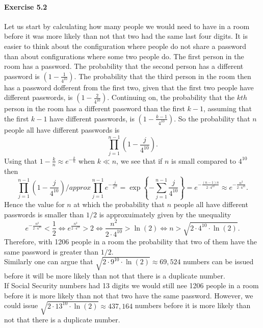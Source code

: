\paragraph{Exercise 5.2} Let us start by calculating how many people we would
need to have in a room before it was more likely than not that two had the
same last four digits. It is easier to think about the configuration where
people do not share a password than about configurations where some two people
do. The first person in the room has a password. The probability that the second
person has a different password is $\left(1- \frac{1}{4^{10}}\right)$. The
probability that the third person in the room then has a password dofferent from
the first two, given that the first two people have different passwords, is
$\left(1- \frac{2}{4^{10}}\right)$. Continuing on, the probability that the
$kth$ person in the room has a different password than the first $k-1$,
assuming that the first $k-1$ have different passwords, is
$\left(1- \frac{k-1}{4^{10}}\right)$. So the probability that $n$ people all
have different passwords is
\[
  \prod_{j=1}^{n-1} \left( 1 - \frac{j}{4^{10}}\right).
\]
Using that $1 - \frac{k}{n} \approx e^{-\frac{k}{n}}$ when $k \ll n$, we see that
if $n$ is small compared to $4^{10}$ then
\[
  \prod_{j=1}^{n-1} \left( 1 - \frac{j}{4^{10}}\right)
  /approx \prod_{j=1}^{n-1} e^{-\frac{j}{4^{10}}}
  = \exp \left\{ - \sum_{j=1}^{n-1} \frac{j}{4^{10}} \right\}
  = e^{-\frac{(n-1)n}{2 \cdot 4^{10}}}
  \approx e^{-\frac{n^2}{2 \cdot 4^{10}}}.
\]
Hence the value for $n$ at which the probability that $n$ people all have
different passwords is smaller than $1/2$ is approxuimately given by the
unequality
\[
  e^{-\frac{n^2}{2 \cdot 4^{10}}} < \frac{1}{2}
  \Leftrightarrow e^{\frac{n^2}{2 \cdot 4^{10}}} > 2
  \Leftrightarrow \frac{n^2}{2 \cdot 4^{10}} > \ln(2)
  \Leftrightarrow n > \sqrt{2 \cdot 4^{10} \cdot \ln(2)}.
\]
Therefore, with 1206 people in a room the probability that two of them have
the same password is greater than $1/2$. \\
Similarly one can argue that $\sqrt{2 \cdot 9^{10} \cdot \ln(2)} \approx 69,524$
numbers can be issued before it will be more likely than not that there is a
duplicate number. \\
If Social Security numbers had 13 digits we would still nee 1206 people in a room
before it is more likely than not that two have the same password. However, we
could issue $\sqrt{2 \cdot 13^{10} \cdot \ln(2)} \approx 437,164$ numbers before
it is more likely than not that there is a duplicate number.

